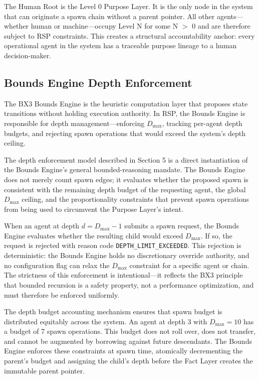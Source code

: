 The Human Root is the Level 0 Purpose Layer. It is the only node in the system that can originate a spawn chain without a parent pointer. All other agents—whether human or machine—occupy Level N for some N $>$ 0 and are therefore subject to RSP constraints. This creates a structural accountability anchor: every operational agent in the system has a traceable purpose lineage to a human decision-maker.

\subsection{Bounds Engine Depth Enforcement}

The BX3 Bounds Engine is the heuristic computation layer that proposes state transitions without holding execution authority. In RSP, the Bounds Engine is responsible for depth management—enforcing $D_{\max}$, tracking per-agent depth budgets, and rejecting spawn operations that would exceed the system's depth ceiling.

The depth enforcement model described in Section 5 is a direct instantiation of the Bounds Engine's general bounded-reasoning mandate. The Bounds Engine does not merely count spawn edges; it evaluates whether the proposed spawn is consistent with the remaining depth budget of the requesting agent, the global $D_{\max}$ ceiling, and the proportionality constraints that prevent spawn operations from being used to circumvent the Purpose Layer's intent.

When an agent at depth $d = D_{\max} - 1$ submits a spawn request, the Bounds Engine evaluates whether the resulting child would exceed $D_{\max}$. If so, the request is rejected with reason code \texttt{DEPTH\_LIMIT\_EXCEEDED}. This rejection is deterministic: the Bounds Engine holds no discretionary override authority, and no configuration flag can relax the $D_{\max}$ constraint for a specific agent or chain. The strictness of this enforcement is intentional—it reflects the BX3 principle that bounded recursion is a safety property, not a performance optimization, and must therefore be enforced uniformly.

The depth budget accounting mechanism ensures that spawn budget is distributed equitably across the system. An agent at depth 3 with $D_{\max} = 10$ has a budget of 7 spawn operations. This budget does not roll over, does not transfer, and cannot be augmented by borrowing against future descendants. The Bounds Engine enforces these constraints at spawn time, atomically decrementing the parent's budget and assigning the child's depth before the Fact Layer creates the immutable parent pointer.

